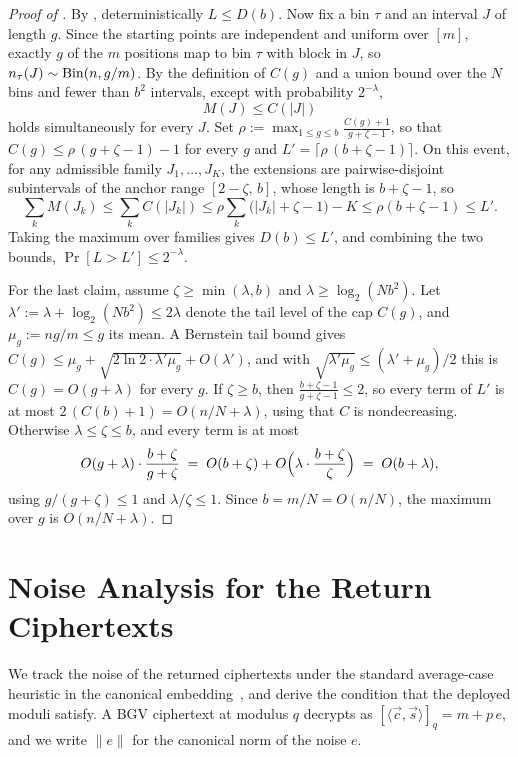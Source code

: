 \begin{proof}[Proof of ]
By , deterministically $L \le D(b)$. Now fix a
bin $\tau$ and an interval $J$ of length $g$. Since the starting points
are independent and uniform over $[m]$, exactly $g$ of the $m$
positions map to bin $\tau$ with block in $J$, so
$n_\tau(J)\sim\mathrm{Bin}(n, g/m)$. By the definition of $C(g)$ and a union
bound over the $N$ bins and fewer than $b^2$ intervals, except with
probability $2^{-\lambda}$,
\[
  M(J)\le C(|J|)
\]
holds simultaneously for every $J$. Set
$\rho := \max_{1\le g\le b} \frac{C(g)+1}{g+\zeta-1}$, so that
$C(g) \le \rho\,(g+\zeta-1)-1$ for every $g$ and
$L' = \lceil\rho\,(b+\zeta-1)\rceil$. On this event, for any admissible
family $J_1,\ldots,J_K$, the extensions are pairwise-disjoint
subintervals of the anchor range $[2-\zeta,\,b]$, whose length is
$b+\zeta-1$, so
\[
  \sum_k M(J_k)
  \le \sum_k C(|J_k|)
  \le \rho\sum_k \bigl(|J_k|+\zeta-1\bigr) - K
  \le \rho(b+\zeta-1)
  \le L'.
\]
Taking the maximum over families gives $D(b)\le L'$, and combining the
two bounds, $\Pr[L>L']\le 2^{-\lambda}$.

For the last claim, assume $\zeta \ge \min(\lambda,b)$ and
$\lambda \ge \log_2(Nb^2)$. Let
$\lambda' := \lambda+\log_2(Nb^2) \le 2\lambda$ denote the tail level
of the cap $C(g)$, and $\mu_g := ng/m \le g$ its mean. A Bernstein tail
bound gives
$C(g) \le \mu_g + \sqrt{2\ln 2\cdot\lambda'\mu_g} + O(\lambda')$, and
with $\sqrt{\lambda'\mu_g}\le(\lambda'+\mu_g)/2$ this is
$C(g) = O(g+\lambda)$ for every $g$. If $\zeta \ge b$, then
$\tfrac{b+\zeta-1}{g+\zeta-1} \le 2$, so every term of $L'$ is at most
$2\,(C(b)+1) = O(n/N+\lambda)$, using that $C$ is nondecreasing.
Otherwise $\lambda \le \zeta \le b$, and every term is at most
\[
  O(g+\lambda)\cdot\frac{b+\zeta}{g+\zeta}
  \;=\; O(b+\zeta) + O\Bigl(\lambda\cdot\frac{b+\zeta}{\zeta}\Bigr)
  \;=\; O(b+\lambda),
\]
using $g/(g+\zeta)\le1$ and $\lambda/\zeta\le1$. Since $b=m/N=O(n/N)$,
the maximum over $g$ is $O(n/N+\lambda)$.
\end{proof}

\section{Noise Analysis for the Return Ciphertexts}\label{app:noise}

We track the noise of the returned ciphertexts under the standard average-case heuristic in the canonical embedding~\cite{GHS12}, and derive the condition that the deployed moduli satisfy. A BGV ciphertext at modulus $q$ decrypts as $[\langle\vec c,\vec s\rangle]_q = m + p\,e$, and we write $\|e\|$ for the canonical norm of the noise $e$.

